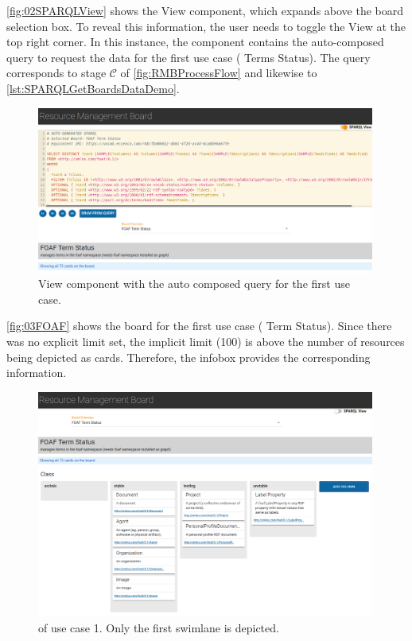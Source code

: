 \newpage

\noindent \autoref{fig:02SPARQLView} shows the  View component, which expands above the board selection box. To reveal this information, the user needs to toggle the  View at the top right corner. In this instance, the component contains the auto-composed query to request the data for the first use case ( Terms Status). The query corresponds to stage {\small \hyperref[ssec:QS-C]{\(\mathcal{C}\)}} of \autoref{fig:RMBProcessFlow} and likewise to \autoref{lst:SPARQLGetBoardsDataDemo}.

\begin{figure}[H]
\centering
\includegraphics[width=0.99\textwidth]{img/02-SPARQL-View.png}
	\caption[ —  View]{ View component with the auto composed query for the first use case.}
	\label{fig:02SPARQLView}
\end{figure}


\noindent \autoref{fig:03FOAF} shows the board for the first use case ( Term Status). Since there was no explicit limit set, the implicit limit (100) is above the number of resources being depicted as cards. Therefore, the infobox provides the corresponding information.

\begin{figure}[H]
\centering
\includegraphics[width=0.99\textwidth]{img/03-FOAF.png}
	\caption[ of Use Case 1]{ of use case 1. Only the first swimlane is depicted.}
	\label{fig:03FOAF}
\end{figure}

